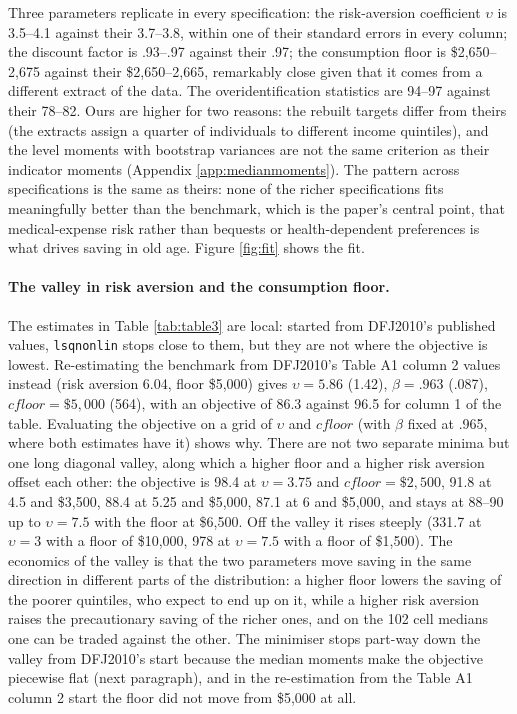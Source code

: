 \documentclass[11pt,fleqn]{article}
\begin{document}
Three parameters replicate in every specification: the risk-aversion coefficient $\upsilon$ is 3.5--4.1 against their 3.7--3.8, within one of their standard errors in every column; the discount factor is .93--.97 against their .97; the consumption floor is \$2,650--2,675 against their \$2,650--2,665, remarkably close given that it comes from a different extract of the data. The overidentification statistics are 94--97 against their 78--82. Ours are higher for two reasons: the rebuilt targets differ from theirs (the extracts assign a quarter of individuals to different income quintiles), and the level moments with bootstrap variances are not the same criterion as their indicator moments (Appendix \ref{app:medianmoments}). The pattern across specifications is the same as theirs: none of the richer specifications fits meaningfully better than the benchmark, which is the paper's central point, that medical-expense risk rather than bequests or health-dependent preferences is what drives saving in old age. Figure \ref{fig:fit} shows the fit.

\paragraph{The valley in risk aversion and the consumption floor.} The estimates in Table \ref{tab:table3} are local: started from DFJ2010's published values, \texttt{lsqnonlin} stops close to them, but they are not where the objective is lowest. Re-estimating the benchmark from DFJ2010's Table A1 column 2 values instead (risk aversion 6.04, floor \$5,000) gives $\upsilon=5.86$ (1.42), $\beta=.963$ (.087), $cfloor=\$5{,}000$ (564), with an objective of 86.3 against 96.5 for column 1 of the table. Evaluating the objective on a grid of $\upsilon$ and $cfloor$ (with $\beta$ fixed at .965, where both estimates have it) shows why. There are not two separate minima but one long diagonal valley, along which a higher floor and a higher risk aversion offset each other: the objective is 98.4 at $\upsilon=3.75$ and $cfloor=\$2{,}500$, 91.8 at 4.5 and \$3,500, 88.4 at 5.25 and \$5,000, 87.1 at 6 and \$5,000, and stays at 88--90 up to $\upsilon=7.5$ with the floor at \$6,500. Off the valley it rises steeply (331.7 at $\upsilon=3$ with a floor of \$10,000, 978 at $\upsilon=7.5$ with a floor of \$1,500). The economics of the valley is that the two parameters move saving in the same direction in different parts of the distribution: a higher floor lowers the saving of the poorer quintiles, who expect to end up on it, while a higher risk aversion raises the precautionary saving of the richer ones, and on the 102 cell medians one can be traded against the other. The minimiser stops part-way down the valley from DFJ2010's start because the median moments make the objective piecewise flat (next paragraph), and in the re-estimation from the Table A1 column 2 start the floor did not move from \$5,000 at all.
\end{document}
